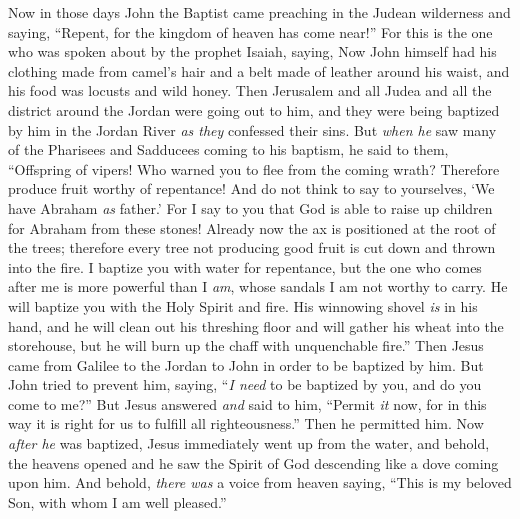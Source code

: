 \begin{biblechapter} %
 Now in those days John the Baptist came preaching in the Judean wilderness
\verse and saying, “Repent, for the kingdom of heaven has come near!”
\verse For this is the one who was spoken about by the prophet Isaiah, saying,
\verse Now John himself had his clothing made from camel’s hair and a belt made of leather around his waist, and his food was locusts and wild honey.
\verse Then Jerusalem and all Judea and all the district around the Jordan were going out to him,
\verse and they were being baptized by him in the Jordan River \textit{as they} confessed their sins.
\verse But \textit{when he} saw many of the Pharisees and Sadducees coming to his baptism, he said to them, “Offspring of vipers! Who warned you to flee from the coming wrath?
\verse Therefore produce fruit worthy of repentance!
\verse And do not think to say to yourselves, ‘We have Abraham \textit{as} father.’ For I say to you that God is able to raise up children for Abraham from these stones!
\verse Already now the ax is positioned at the root of the trees; therefore every tree not producing good fruit is cut down and thrown into the fire.
\verse I baptize you with water for repentance, but the one who comes after me is more powerful than I \textit{am}, whose sandals I am not worthy to carry. He will baptize you with the Holy Spirit and fire.
\verse His winnowing shovel \textit{is} in his hand, and he will clean out his threshing floor and will gather his wheat into the storehouse, but he will burn up the chaff with unquenchable fire.”
 Then Jesus came from Galilee to the Jordan to John in order to be baptized by him.
\verse But John tried to prevent him, saying, “\textit{I need} to be baptized by you, and do you come to me?”
\verse But Jesus answered \textit{and} said to him, “Permit \textit{it} now, for in this way it is right for us to fulfill all righteousness.” Then he permitted him.
\verse Now \textit{after he} was baptized, Jesus immediately went up from the water, and behold, the heavens opened and he saw the Spirit of God descending like a dove coming upon him.
\verse And behold, \textit{there was} a voice from heaven saying, “This is my beloved Son, with whom I am well pleased.”
\end{biblechapter}

